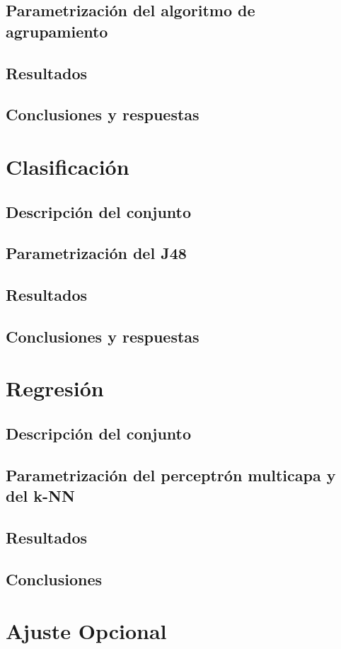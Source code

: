 \documentclass[a4paper, 11pt, twoside, openany, onecolumn, final]{memoir}
\begin{document}
	\section{Parametrización del algoritmo de agrupamiento}
	
	\section{Resultados}
	\section{Conclusiones y respuestas}
	\chapter{Clasificación}
		\section{Descripción del conjunto}
	\section{Parametrización del J48}
	\section{Resultados}
	\section{Conclusiones y respuestas}
	\chapter{Regresión}
		\section{Descripción del conjunto}
	\section{Parametrización del perceptrón multicapa y del k-NN}
	\section{Resultados}
	\section{Conclusiones}
	\chapter{Ajuste Opcional}
\end{document}
